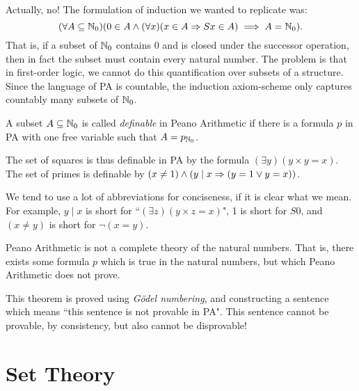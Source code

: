 \documentclass{article}
\begin{document}
Actually, no! The formulation of induction we wanted to replicate was:
\[
(\forall A \subseteq \mathbb{N}_0)(0 \in A \land (\forall x)(x \in A \Rightarrow Sx \in A) \implies A = \mathbb{N}_0).
\]
That is, if a subset of $\mathbb{N}_0$ contains 0 and is closed under the successor operation, then in fact the subset must contain every natural number. The problem is that in first-order logic, we cannot do this quantification over subsets of a structure. Since the language of PA is countable, the induction axiom-scheme only captures countably many subsets of $\mathbb{N}_0$.

\begin{definition}[Definable]
    A subset $A \subseteq \mathbb{N}_0$ is called \textit{definable} in Peano Arithmetic if there is a formula $p$ in PA with one free variable such that $A = p_{\mathbb{N}_0}$.
    
    The set of squares is thus definable in PA by the formula $(\exists y)(y \times y = x)$. The set of primes is definable by $(x \neq 1) \land (y \mid x \Rightarrow (y = 1 \lor y = x))$.
\end{definition}

\begin{note}
	We tend to use a lot of abbreviations for conciseness, if it is clear what we mean. For example, $y \mid x$ is short for ``$(\exists z)(y \times z = x)$", 1 is short for $S0$, and $(x \neq y)$ is short for $\lnot(x = y)$.
\end{note}

\begin{theorem}
    Peano Arithmetic is not a complete theory of the natural numbers. That is, there exists some formula $p$ which is true in the natural numbers, but which Peano Arithmetic does not prove.
\end{theorem}

\begin{prf}
    This theorem is proved using \textit{G\"odel numbering}, and constructing a sentence which means ``this sentence is not provable in PA". This sentence cannot be provable, by consistency, but also cannot be disprovable!
\end{prf}


\pagebreak
\section{Set Theory}
\label{section-set-theory}
\end{document}
